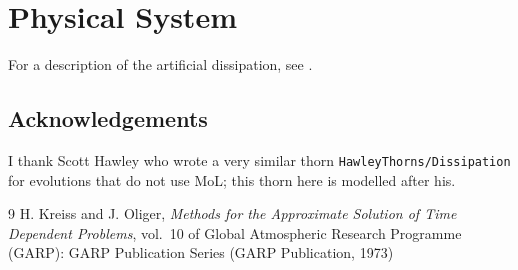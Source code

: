 
\section{Physical System}
For a description of the artificial dissipation, see
\cite{kreiss-oliger}.

\subsection{Acknowledgements}
I thank Scott Hawley who wrote a very similar thorn
\texttt{HawleyThorns/Dissipation} for evolutions that do not use MoL;
this thorn here is modelled after his.

\begin{thebibliography}{9}
H. Kreiss and J. Oliger, \emph{Methods for the Approximate Solution of
Time Dependent Problems}, vol.\ 10 of Global Atmospheric Research
Programme (GARP): GARP Publication Series (GARP Publication, 1973)
\end{thebibliography}



